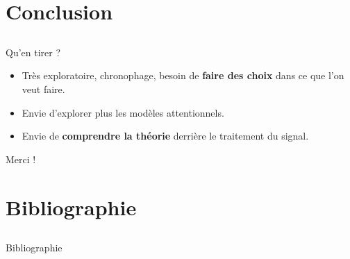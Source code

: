 \documentclass[compress,xcolor=table]{beamer}
\begin{document}
\section{Conclusion} \subsection{}

\begin{frame}{}

    \begin{block}{Qu'en tirer ?}
        \begin{itemize}
            \item Très exploratoire, chronophage, besoin de \textbf{faire des choix} dans ce que l'on veut faire.
            \item Envie d'explorer plus les modèles attentionnels.
            \item Envie de \textbf{comprendre la théorie} derrière le traitement du signal.
        \end{itemize}
    \end{block}

    Merci !

\end{frame}

\section{Bibliographie} \subsection{}

\begin{frame}[allowframebreaks]{Bibliographie}

    \printbibliography[heading=none]

\end{frame}
\end{document}
